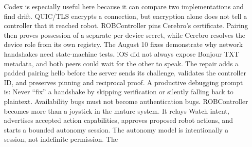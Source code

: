 {}Codex is especially useful here because it can compare two implementations and\markdownRendererSoftLineBreak
{}find drift.\markdownRendererInterblockSeparator
{}\markdownRendererInterblockSeparator
{}
\markdownRendererSectionEnd \markdownRendererSectionBegin
{}\markdownRendererInterblockSeparator
{}QUIC/TLS encrypts a connection, but encryption alone does not tell a controller\markdownRendererSoftLineBreak
{}that it reached  robot. ROBController pins Cerebro's certificate. Pairing\markdownRendererSoftLineBreak
{}then proves possession of a separate per-device secret, while Cerebro resolves\markdownRendererSoftLineBreak
{}the device role from its own registry.\markdownRendererParagraphSeparator
{}The August 10 fixes demonstrate why network handshakes need state-machine tests.\markdownRendererSoftLineBreak
{}iOS did not always expose Bonjour TXT metadata, and both peers could wait for\markdownRendererSoftLineBreak
{}the other to speak. The repair adds a padded pairing hello before the server\markdownRendererSoftLineBreak
{}sends its challenge, validates the controller ID, and preserves pinning and\markdownRendererSoftLineBreak
{}reciprocal proof.\markdownRendererParagraphSeparator
{}A productive debugging prompt is:\markdownRendererInterblockSeparator
{}\markdownRendererInterblockSeparator
{}Never “fix” a handshake by skipping verification or silently falling back to\markdownRendererSoftLineBreak
{}plaintext. Availability bugs must not become authentication bugs.\markdownRendererInterblockSeparator
{}\markdownRendererThematicBreak{}\markdownRendererInterblockSeparator
{}
\markdownRendererSectionEnd 
\markdownRendererSectionEnd \markdownRendererSectionBegin
{}\markdownRendererInterblockSeparator
{}ROBController becomes more than a joystick in the mature system. It relays\markdownRendererSoftLineBreak
{}Watch intent, advertises accepted action capabilities, approves proposed robot\markdownRendererSoftLineBreak
{}actions, and starts a bounded autonomy session.\markdownRendererParagraphSeparator
{}The autonomy model is intentionally a session, not indefinite permission. The\markdownRendererSoftLineBreak

